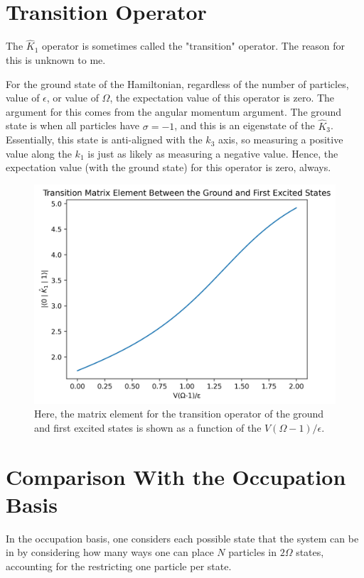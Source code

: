 \documentclass[
a4paper,
10pt,
twoside,
]{article}
\begin{document}
\section{Transition Operator}\label{sec: transition}


The $\hat{K}_1$ operator is sometimes called the "transition" operator.
The reason for this is unknown to me.

For the ground state of the Hamiltonian, regardless of the number of particles, value of $\epsilon$, or value of $\Omega$, the expectation value of this operator is zero.
The argument for this comes from the angular momentum argument.
The ground state is when all particles have $\sigma = -1$, and this is an eigenstate of the $\hat{K}_3$.
Essentially, this state is anti-aligned with the $k_3$ axis, so measuring a positive value along the $k_1$ is just as likely as measuring a negative value.
Hence, the expectation value (with the ground state) for this operator is zero, always.

\begin{figure}[H]
	\centering
	\includegraphics[width=0.8\linewidth]{figures/transitionMatrixElement.png}
	\caption{
		Here, the matrix element for the transition operator of the ground and first excited states is shown as a function of the $V(\Omega-1)/\epsilon$.
	}
	\label{fig: trans_mat_elem}
\end{figure}


\section{Comparison With the Occupation Basis}

In the occupation basis, one considers each possible state that the system can be in by considering how many ways one can place $N$ particles in $2\Omega$ states, accounting for the restricting one particle per state.
\end{document}
